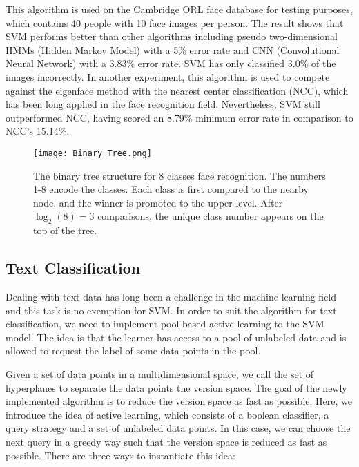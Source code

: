 This algorithm is used on the Cambridge ORL face database for testing purposes, 
which contains 40 people with 10 face images per person.
The result shows that SVM performs better than other algorithms including
pseudo two-dimensional HMMs (Hidden Markov Model) with a 5\% error rate 
and CNN (Convolutional Neural Network) with a 3.83\% error rate. SVM has
only classified 3.0\% of the images incorrectly. In another experiment,
this algorithm is used to compete against the eigenface method
with the nearest center classification (NCC), which has been long applied
in the face recognition field. Nevertheless, SVM still outperformed NCC,
having scored an 8.79\% minimum error rate in comparison to NCC's 15.14\%.
\cite{face-recognition}
\begin{figure}[h]%
    \begin{center}%
        \texttt{[image: Binary\_Tree.png]}%
        \caption{The binary tree structure for 8 classes face recognition.
        The numbers 1-8 encode the classes. 
        Each class is first compared to the nearby node,
        and the winner is promoted to the upper level.
        After $\log_2(8) = 3$ comparisons,
        the unique class number appears 
        on the top of the tree.
         \cite{face-recognition}}\label{fig:}%
    \end{center}%
\end{figure}

\subsection*{Text Classification}
Dealing with text data has long been a challenge in the machine learning
field and this task is no exemption for SVM. In order to suit the algorithm
for text classification, we need to implement pool-based active learning
to the SVM model. The idea is that the learner has access to a pool of
unlabeled data and is allowed to request the label of some data points
in the pool.

Given a set of data points in a multidimensional space, we call the set
of hyperplanes to separate the data points the version space. The goal of
the newly implemented algorithm is to reduce the version space as fast as
possible. Here, we introduce the idea of active learning, which consists of
a boolean classifier, a query strategy and a set of unlabeled data points.
In this case, we can choose the next query in a greedy way such that 
the version space is reduced as fast as possible. There are three ways
to instantiate this idea: 

